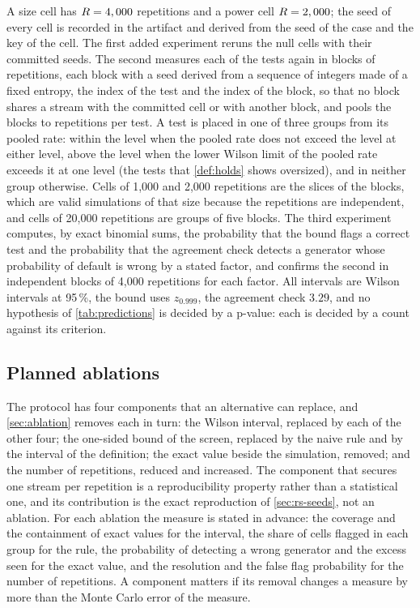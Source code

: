 A size cell has $R=4,000{}$ repetitions and a power cell $R=2,000{}$; the seed of every cell is recorded in the artifact and derived from the seed of the case and the key of the cell.
The first added experiment reruns the \nTests{} null cells with their committed seeds.
The second measures each of the \nTests{} tests again in \nBlocks{} blocks of \nNullReps{} repetitions, each block with a seed derived from a sequence of integers made of a fixed entropy, the index of the test and the index of the block, so that no block shares a stream with the committed cell or with another block, and pools the blocks to \nRepsPooled{} repetitions per test.
A test is placed in one of three groups from its pooled rate: within the level when the pooled rate does not exceed the level at either level, above the level when the lower Wilson limit of the pooled rate exceeds it at one level (the tests that \cref{def:holds} shows oversized), and in neither group otherwise.
Cells of 1,000 and 2,000 repetitions are the slices of the blocks, which are valid simulations of that size because the repetitions are independent, and cells of 20,000 repetitions are groups of five blocks.
The third experiment computes, by exact binomial sums, the probability that the bound flags a correct test and the probability that the agreement check detects a generator whose probability of default is wrong by a stated factor, and confirms the second in \agBlocks{} independent blocks of 4,000 repetitions for each factor.
All intervals are Wilson intervals at 95\,\%, the bound uses $z_{0.999}$, the agreement check $3.29$, and no hypothesis of \cref{tab:predictions} is decided by a p-value: each is decided by a count against its criterion.

\subsection{Planned ablations}
\label{sec:ed-ablation}

The protocol has four components that an alternative can replace, and \cref{sec:ablation} removes each in turn: the Wilson interval, replaced by each of the other four; the one-sided bound of the screen, replaced by the naive rule and by the interval of the definition; the exact value beside the simulation, removed; and the number of repetitions, reduced and increased.
The component that secures one stream per repetition is a reproducibility property rather than a statistical one, and its contribution is the exact reproduction of \cref{sec:rs-seeds}, not an ablation. For each ablation the measure is stated in advance: the coverage and the containment of exact values for the interval, the share of cells flagged in each group for the rule, the probability of detecting a wrong generator and the excess seen for the exact value, and the resolution and the false flag probability for the number of repetitions. A component matters if its removal changes a measure by more than the Monte Carlo error of the measure.
